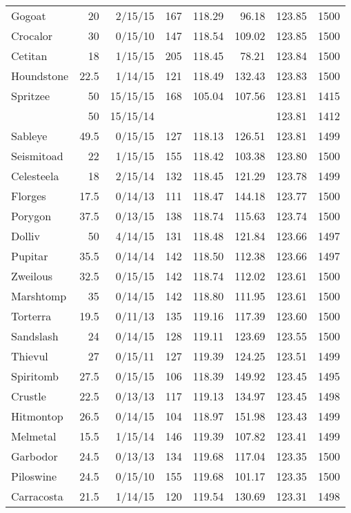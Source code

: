 \begin{longtable}{lrrrrrrr}
Gogoat & 20 & 2/15/15 & 167 & 118.29 & 96.18 & 123.85 & 1500\\
Crocalor & 30 & 0/15/10 & 147 & 118.54 & 109.02 & 123.85 & 1500\\
Cetitan & 18 & 1/15/15 & 205 & 118.45 & 78.21 & 123.84 & 1500\\
Houndstone & 22.5 & 1/14/15 & 121 & 118.49 & 132.43 & 123.83 & 1500\\
Spritzee & 50 & 15/15/15 & 168 & 105.04 & 107.56 & 123.81 & 1415\\
 & 50 & 15/15/14 & & & & 123.81 & 1412\\
Sableye & 49.5 & 0/15/15 & 127 & 118.13 & 126.51 & 123.81 & 1499\\
Seismitoad & 22 & 1/15/15 & 155 & 118.42 & 103.38 & 123.80 & 1500\\
Celesteela & 18 & 2/15/14 & 132 & 118.45 & 121.29 & 123.78 & 1499\\
Florges & 17.5 & 0/14/13 & 111 & 118.47 & 144.18 & 123.77 & 1500\\
Porygon & 37.5 & 0/13/15 & 138 & 118.74 & 115.63 & 123.74 & 1500\\
Dolliv & 50 & 4/14/15 & 131 & 118.48 & 121.84 & 123.66 & 1497\\
Pupitar & 35.5 & 0/14/14 & 142 & 118.50 & 112.38 & 123.66 & 1497\\
Zweilous & 32.5 & 0/15/15 & 142 & 118.74 & 112.02 & 123.61 & 1500\\
Marshtomp & 35 & 0/14/15 & 142 & 118.80 & 111.95 & 123.61 & 1500\\
Torterra & 19.5 & 0/11/13 & 135 & 119.16 & 117.39 & 123.60 & 1500\\
Sandslash & 24 & 0/14/15 & 128 & 119.11 & 123.69 & 123.55 & 1500\\
Thievul & 27 & 0/15/11 & 127 & 119.39 & 124.25 & 123.51 & 1499\\
Spiritomb & 27.5 & 0/15/15 & 106 & 118.39 & 149.92 & 123.45 & 1495\\
Crustle & 22.5 & 0/13/13 & 117 & 119.13 & 134.97 & 123.45 & 1498\\
Hitmontop & 26.5 & 0/14/15 & 104 & 118.97 & 151.98 & 123.43 & 1499\\
Melmetal & 15.5 & 1/15/14 & 146 & 119.39 & 107.82 & 123.41 & 1499\\
Garbodor & 24.5 & 0/13/13 & 134 & 119.68 & 117.04 & 123.35 & 1500\\
Piloswine & 24.5 & 0/15/10 & 155 & 119.68 & 101.17 & 123.35 & 1500\\
Carracosta & 21.5 & 1/14/15 & 120 & 119.54 & 130.69 & 123.31 & 1498\\

\end{longtable}
